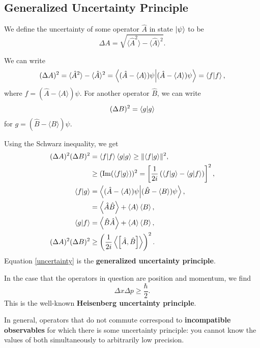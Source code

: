 \subsection{Generalized Uncertainty Principle}
We define the uncertainty of some operator $\hat{A}$ in state $\left| \psi \right\rangle$ to be 
\begin{equation}
\Delta A = \sqrt{\langle \hat{A}^2 \rangle  - \langle \hat{A} \rangle^2}.
\end{equation}

We can write 
\begin{equation*}
(\Delta A)^2 = \langle \hat{A}^2 \rangle  - \langle \hat{A} \rangle^2 = \left\langle (\hat{A} - \langle A \rangle ) \psi \middle| (\hat{A} - \langle A \rangle ) \psi \right\rangle = \left\langle f \middle| f \right\rangle,
\end{equation*}
where $f = (\hat{A} - \langle A \rangle ) \psi$. For another operator $\hat{B}$, we can write 
\begin{equation*}
(\Delta B)^2 = \left\langle g \middle| g \right\rangle
\end{equation*}
for $g = (\hat{B} - \langle B \rangle ) \psi$.

Using the Schwarz inequality, we get 
\begin{align}
(\Delta A)^2(\Delta B)^2 &= \left\langle f \middle| f \right\rangle \left\langle g \middle| g \right\rangle \geq \lVert\left\langle f \middle| g \right\rangle\rVert^2,\nonumber\\
&\geq (\operatorname{Im} (\left\langle f \middle| g \right\rangle))^2 = \left[\frac{1}{2i}\left(\left\langle f \middle| g \right\rangle-\left\langle g \middle| f \right\rangle \right) \right]^2,\nonumber\\
\left\langle f \middle| g \right\rangle &= \left\langle (\hat{A} - \langle A \rangle ) \psi \middle| (\hat{B} - \langle B \rangle ) \psi \right\rangle, \\
&= \left\langle \hat{A}\hat{B} \right\rangle + \left\langle A \right\rangle\left\langle B \right\rangle, \nonumber \\
\left\langle g \middle| f \right\rangle &=  \left\langle \hat{B}\hat{A} \right\rangle + \left\langle A \right\rangle\left\langle B \right\rangle,\nonumber \\
(\Delta A)^2(\Delta B)^2 &\geq \left(\frac{1}{2i} \left\langle \left[\hat{A}, \hat{B}\right] \right\rangle\right)^2. \label{uncertainty}
\end{align}
Equation \ref{uncertainty} is the \textbf{generalized uncertainty principle}. 

In the case that the operators in question are position and momentum, we find
\begin{equation}
\Delta x \Delta p \geq \frac{\hbar}{2}.
\end{equation}
This is the well-known \textbf{Heisenberg uncertainty principle}.

In general, operators that do not commute correspond to \textbf{incompatible observables} for which there is some uncertainty principle: you cannot know the values of both simultaneously to arbitrarily low precision. 